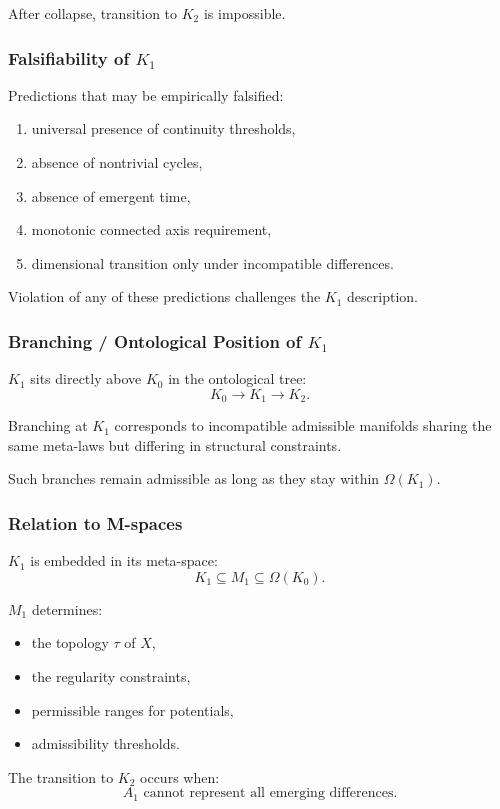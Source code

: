 After collapse, transition to $K_2$ is impossible.

\subsubsection{Falsifiability of \texorpdfstring{$K_1$}{K_1}}

Predictions that may be empirically falsified:
\begin{enumerate}
    \item universal presence of continuity thresholds,
    \item absence of nontrivial cycles,
    \item absence of emergent time,
    \item monotonic connected axis requirement,
    \item dimensional transition only under incompatible differences.
\end{enumerate}

Violation of any of these predictions challenges the $K_1$ description.

\subsubsection{Branching / Ontological Position of \texorpdfstring{$K_1$}{K_1}}

$K_1$ sits directly above $K_0$ in the ontological tree:
\[
K_0 \to K_1 \to K_2.
\]

Branching at $K_1$ corresponds to incompatible admissible manifolds
sharing the same meta-laws but differing in structural constraints.

Such branches remain admissible as long as they stay within $\Omega(K_1)$.

\subsubsection{Relation to M-spaces}

$K_1$ is embedded in its meta-space:
\[
K_1 \subseteq M_1 \subseteq \Omega(K_0).
\]

$M_1$ determines:
\begin{itemize}
    \item the topology $\tau$ of $X$,
    \item the regularity constraints,
    \item permissible ranges for potentials,
    \item admissibility thresholds.
\end{itemize}

The transition to $K_2$ occurs when:
\[
A_1 \text{ cannot represent all emerging differences.}
\]
